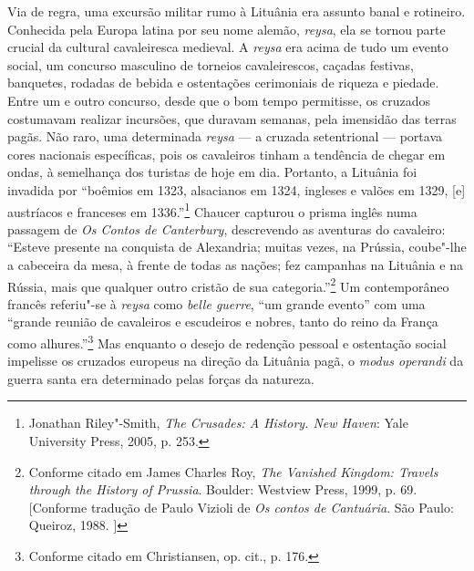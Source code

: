 Via de regra, uma excursão militar rumo à Lituânia era assunto banal e
rotineiro. Conhecida pela Europa latina por seu nome alemão,
\emph{reysa}, ela se tornou parte crucial da cultural cavaleiresca
medieval. A \emph{reysa} era acima de tudo um evento social, um concurso
masculino de torneios cavaleirescos, caçadas festivas, banquetes,
rodadas de bebida e ostentações cerimoniais de riqueza e piedade. Entre
um e outro concurso, desde que o bom tempo permitisse, os cruzados
costumavam realizar incursões, que duravam semanas, pela imensidão das
terras pagãs. Não raro, uma determinada \emph{reysa} --- a cruzada
setentrional --- portava cores nacionais específicas, pois os cavaleiros
tinham a tendência de chegar em ondas, à semelhança dos turistas de hoje
em dia. Portanto, a Lituânia foi invadida por ``boêmios em 1323,
alsacianos em 1324, ingleses e valões em 1329, {[}e{]} austríacos e
franceses em 1336.''\footnote{Jonathan Riley"-Smith, \emph{The Crusades:
  A History. New Haven}: Yale University Press, 2005, p. 253.} Chaucer
capturou o prisma inglês numa passagem de \emph{Os Contos de
Canterbury}, descrevendo as aventuras do cavaleiro: ``Esteve presente na
conquista de Alexandria; muitas vezes, na Prússia, coube"-lhe a cabeceira
da mesa, à frente de todas as nações; fez campanhas na Lituânia e na
Rússia, mais que qualquer outro cristão de sua categoria.''\footnote{Conforme
  citado em James Charles Roy, \emph{The Vanished Kingdom: Travels
  through the History of Prussia}. Boulder: Westview Press, 1999, p. 69.
  [Conforme tradução de Paulo Vizioli de \emph{Os contos de
  Cantuária}. São Paulo:  Queiroz, 1988. ]} Um contemporâneo francês
referiu"-se à \emph{reysa} como \emph{belle guerre}, ``um grande evento''
com uma ``grande reunião de cavaleiros e escudeiros e nobres, tanto do
reino da França como alhures.''\footnote{Conforme citado em
  Christiansen, op. cit., p. 176.} Mas enquanto o desejo de redenção
pessoal e ostentação social impelisse os cruzados europeus na direção da
Lituânia pagã, o \emph{modus operandi} da guerra santa era determinado
pelas forças da natureza.


